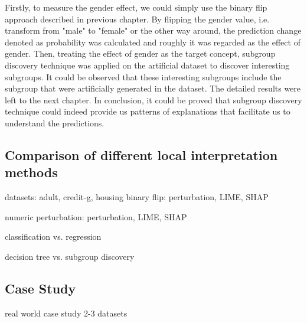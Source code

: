 Firstly, to measure the gender effect, we could simply use the binary flip approach described in previous chapter. By flipping the gender value, i.e. transform from "male" to "female" or the other way around, the prediction change denoted as probability was calculated and roughly it was regarded as the effect of gender. Then, treating the effect of gender as the target concept, subgroup discovery technique was applied on the artificial dataset to discover interesting subgroups. It could be observed that these interesting subgroups include the subgroup that were artificially generated in the dataset. The detailed results were left to the next chapter. In conclusion, it could be proved that subgroup discovery technique could indeed provide us patterns of explanations that facilitate us to understand the predictions. 





\subsection{Comparison of different local interpretation methods}

datasets: adult, credit-g, housing
binary flip: perturbation, LIME, SHAP

numeric perturbation: perturbation, LIME, SHAP

classification vs. regression

decision tree vs. subgroup discovery

\subsection{Case Study}

real world case study 2-3 datasets